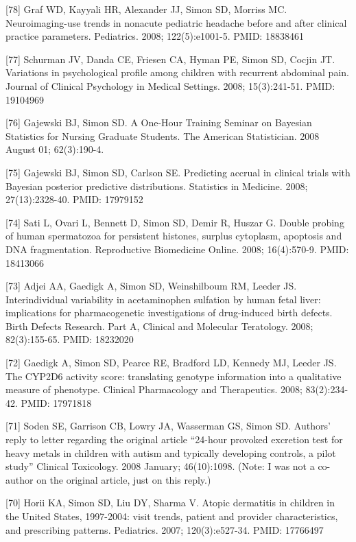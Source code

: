 \documentclass[
  12pt,
]{article}
\begin{document}
{[}78{]} Graf WD, Kayyali HR, Alexander JJ, Simon SD, Morriss MC.
Neuroimaging-use trends in nonacute pediatric headache before and after
clinical practice parameters. Pediatrics. 2008; 122(5):e1001-5. PMID:
18838461

{[}77{]} Schurman JV, Danda CE, Friesen CA, Hyman PE, Simon SD, Cocjin
JT. Variations in psychological profile among children with recurrent
abdominal pain. Journal of Clinical Psychology in Medical Settings.
2008; 15(3):241-51. PMID: 19104969

{[}76{]} Gajewski BJ, Simon SD. A One-Hour Training Seminar on Bayesian
Statistics for Nursing Graduate Students. The American Statistician.
2008 August 01; 62(3):190-4.

{[}75{]} Gajewski BJ, Simon SD, Carlson SE. Predicting accrual in
clinical trials with Bayesian posterior predictive distributions.
Statistics in Medicine. 2008; 27(13):2328-40. PMID: 17979152

{[}74{]} Sati L, Ovari L, Bennett D, Simon SD, Demir R, Huszar G. Double
probing of human spermatozoa for persistent histones, surplus cytoplasm,
apoptosis and DNA fragmentation. Reproductive Biomedicine Online. 2008;
16(4):570-9. PMID: 18413066

{[}73{]} Adjei AA, Gaedigk A, Simon SD, Weinshilboum RM, Leeder JS.
Interindividual variability in acetaminophen sulfation by human fetal
liver: implications for pharmacogenetic investigations of drug-induced
birth defects. Birth Defects Research. Part A, Clinical and Molecular
Teratology. 2008; 82(3):155-65. PMID: 18232020

{[}72{]} Gaedigk A, Simon SD, Pearce RE, Bradford LD, Kennedy MJ, Leeder
JS. The CYP2D6 activity score: translating genotype information into a
qualitative measure of phenotype. Clinical Pharmacology and
Therapeutics. 2008; 83(2):234-42. PMID: 17971818

{[}71{]} Soden SE, Garrison CB, Lowry JA, Wasserman GS, Simon SD.
Authors' reply to letter regarding the original article ``24-hour
provoked excretion test for heavy metals in children with autism and
typically developing controls, a pilot study'' Clinical Toxicology. 2008
January; 46(10):1098. (Note: I was not a co-author on the original
article, just on this reply.)

{[}70{]} Horii KA, Simon SD, Liu DY, Sharma V. Atopic dermatitis in
children in the United States, 1997-2004: visit trends, patient and
provider characteristics, and prescribing patterns. Pediatrics. 2007;
120(3):e527-34. PMID: 17766497
\end{document}
